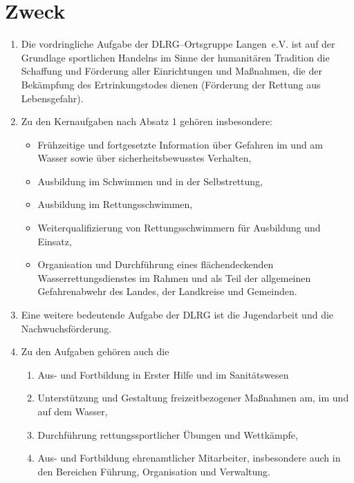 \documentclass[%
12pt, %
a4paper, %
headsepline, %
parskip, %
headings=normal, %
]{scrreprt}
\begin{document}
\section{Zweck}
\label{sec:zweck}
\begin{enumerate}
    \item Die vordringliche Aufgabe der DLRG--Ortsgruppe Langen~e.V. ist auf der Grundlage sportlichen Handelns im Sinne der humanitären Tradition die Schaffung und Förderung aller Einrichtungen und Maßnahmen, die der Bekämpfung des Ertrinkungstodes dienen (Förderung der Rettung aus Lebensgefahr).
    \item Zu den Kernaufgaben nach Absatz 1 gehören insbesondere:\begin{itemize}
        \item Frühzeitige und fortgesetzte Information über Gefahren im und am Wasser sowie über sicherheitsbewusstes Verhalten,
        \item Ausbildung im Schwimmen und in der Selbstrettung,
        \item Ausbildung im Rettungsschwimmen,
        \item Weiterqualifizierung von Rettungsschwimmern für Ausbildung und Einsatz,
        \item Organisation und Durchführung eines flächendeckenden Wasserrettungsdienstes im Rahmen und als Teil der allgemeinen Gefahrenabwehr des Landes, der Landkreise und Gemeinden.
      \end{itemize}
    \item Eine weitere bedeutende Aufgabe der DLRG ist die Jugendarbeit und die Nachwuchsförderung.
    \item Zu den Aufgaben gehören auch die \begin{enumerate}[noitemsep]
        \item Aus- und Fortbildung in Erster Hilfe und im Sanitätswesen
        \item Unterstützung und Gestaltung freizeitbezogener Maßnahmen am, im und auf dem Wasser,
        \item Durchführung rettungssportlicher Übungen und Wettkämpfe,
        \item Aus- und Fortbildung ehrenamtlicher Mitarbeiter, insbesondere auch in den Bereichen Führung, Organisation und Verwaltung.
      \end{enumerate}

\end{enumerate}
\end{document}
